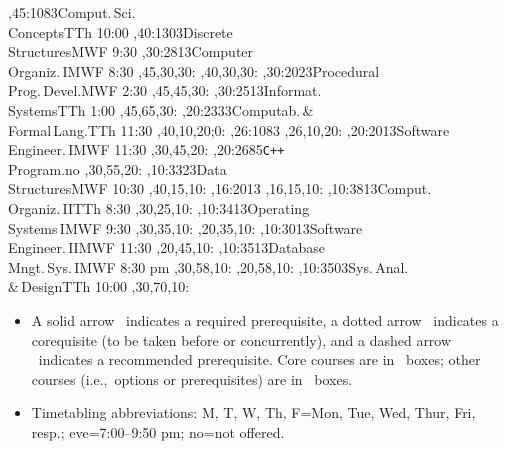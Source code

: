 \documentclass{article}
\begin{document}
\thispagestyle{empty}

\setcounter{diagheight}{50}
\begin{chart}
,45:{1083}{Comput.\,Sci.\\Concepts}{TTh 10:00}
,40:{1303}{Discrete\\Structures}{MWF 9:30}
,30:{2813}{Computer\\Organiz.\,I}{MWF 8:30}
  ,45,30,30:
  ,40,30,30:
,30:{2023}{Procedural\\Prog.\,Devel.}{MWF 2:30}
  ,45,45,30:
,30:{2513}{Informat.\\Systems}{TTh 1:00}
  ,45,65,30:
,20:{2333}{Computab.\,\&\\Formal\,Lang.}{TTh 11:30}
  ,40,10,20;0:
  ,26:{1083}
  ,26,10,20:
,20:{2013}{Software\\Engineer.\,I}{MWF 11:30}
  ,30,45,20:
,20:{2685}{\texttt{C++}\\Program.}{no}
  ,30,55,20:
,10:{3323}{Data\\Structures}{MWF 10:30}
  ,40,15,10:
  ,16:{2013}
  ,16,15,10:
,10:{3813}{Comput.\\Organiz.\,II}{TTh 8:30}
  ,30,25,10:
,10:{3413}{Operating\\Systems\,I}{MWF 9:30}
  ,30,35,10:
  ,20,35,10:
,10:{3013}{Software\\Engineer.\,II}{MWF 11:30}
  ,20,45,10:
,10:{3513}{Database\\Mngt.\,Sys.\,I}{MWF 8:30 pm}
  ,30,58,10:
  ,20,58,10:
,10:{3503}{Sys.\,Anal.\\\&\,Design}{TTh 10:00}
  ,30,70,10:
\end{chart}
\begin{center}
\begin{minipage}{6.0in}
\begin{itemize}
\item
A solid arrow \solidarrow\  indicates a required prerequisite,
a dotted arrow \dottedarrow\
indicates a corequisite (to be taken before or concurrently), and a
dashed arrow \dashedarrow\ indicates a recommended prerequisite.
Core courses are in \boldbox\ boxes;
other courses (i.e.,~options or prerequisites)
are in \lightbox\ boxes.
\item Timetabling abbreviations: M, T, W, Th, F=Mon, Tue, Wed, Thur, Fri,
resp.; eve=7:00--9:50 pm; no=not offered.
\end{itemize}
\end{minipage}
\end{center}
\end{document}
